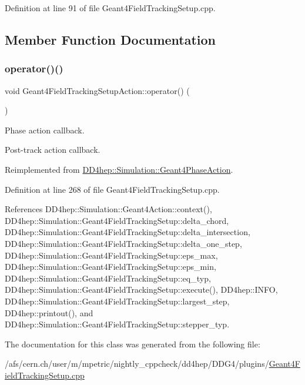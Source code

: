 Definition at line 91 of file Geant4\+Field\+Tracking\+Setup.\+cpp.



\subsection{Member Function Documentation}
\hypertarget{class_d_d4hep_1_1_simulation_1_1_geant4_field_tracking_setup_action_a5412b262d35a196e35807b2a3fe2463b}{}\label{class_d_d4hep_1_1_simulation_1_1_geant4_field_tracking_setup_action_a5412b262d35a196e35807b2a3fe2463b} 
\subsubsection{\texorpdfstring{operator()()}{operator()()}}
{\footnotesize\ttfamily void Geant4\+Field\+Tracking\+Setup\+Action\+::operator() (\begin{DoxyParamCaption}{ }\end{DoxyParamCaption})\hspace{0.3cm}{\ttfamily [virtual]}}



Phase action callback. 

Post-\/track action callback. 

Reimplemented from \hyperlink{class_d_d4hep_1_1_simulation_1_1_geant4_phase_action_a5d8bac662ec707a8cdff0bd3cdd9b831}{D\+D4hep\+::\+Simulation\+::\+Geant4\+Phase\+Action}.



Definition at line 268 of file Geant4\+Field\+Tracking\+Setup.\+cpp.



References D\+D4hep\+::\+Simulation\+::\+Geant4\+Action\+::context(), D\+D4hep\+::\+Simulation\+::\+Geant4\+Field\+Tracking\+Setup\+::delta\+\_\+chord, D\+D4hep\+::\+Simulation\+::\+Geant4\+Field\+Tracking\+Setup\+::delta\+\_\+intersection, D\+D4hep\+::\+Simulation\+::\+Geant4\+Field\+Tracking\+Setup\+::delta\+\_\+one\+\_\+step, D\+D4hep\+::\+Simulation\+::\+Geant4\+Field\+Tracking\+Setup\+::eps\+\_\+max, D\+D4hep\+::\+Simulation\+::\+Geant4\+Field\+Tracking\+Setup\+::eps\+\_\+min, D\+D4hep\+::\+Simulation\+::\+Geant4\+Field\+Tracking\+Setup\+::eq\+\_\+typ, D\+D4hep\+::\+Simulation\+::\+Geant4\+Field\+Tracking\+Setup\+::execute(), D\+D4hep\+::\+I\+N\+FO, D\+D4hep\+::\+Simulation\+::\+Geant4\+Field\+Tracking\+Setup\+::largest\+\_\+step, D\+D4hep\+::printout(), and D\+D4hep\+::\+Simulation\+::\+Geant4\+Field\+Tracking\+Setup\+::stepper\+\_\+typ.



The documentation for this class was generated from the following file\+:\begin{DoxyCompactItemize}
\item 
/afs/cern.\+ch/user/m/mpetric/nightly\+\_\+cppcheck/dd4hep/\+D\+D\+G4/plugins/\hyperlink{_geant4_field_tracking_setup_8cpp}{Geant4\+Field\+Tracking\+Setup.\+cpp}\end{DoxyCompactItemize}
